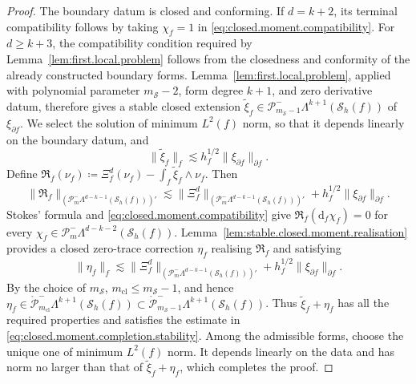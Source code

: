 \documentclass[a4paper,11pt]{article}
\theoremstyle{definition}
\newcommand{\DIFF}{\mathrm{d}}
\newcommand{\Sh}{\mathcal{S}_h}
\newcommand{\PLtrim}[2]{\mathcal{P}_{#1}^{-}\Lambda^{#2}}
\newcommand{\PLtrimz}[2]{\mathring{\mathcal P}_{#1}^{-}\Lambda^{#2}}
\begin{document}
\begin{proof}
The boundary datum is closed and conforming.
If $d=k+2$, its terminal compatibility follows by taking $\chi_f=1$ in \eqref{eq:closed.moment.compatibility}.
For $d\geq k+3$, the compatibility condition required by Lemma~\ref{lem:first.local.problem} follows from the closedness and conformity of the already constructed boundary forms.
Lemma~\ref{lem:first.local.problem}, applied with polynomial parameter $m_{\mathcal S}-2$, form degree $k+1$, and zero derivative datum, therefore gives a stable closed extension $\widetilde\xi_f \in \PLtrim{m_{\mathcal S}-1}{k+1}(\Sh(f))$ of $\xi_{\partial f}$.
We select the solution of minimum $L^2(f)$ norm, so that it depends linearly on the boundary datum, and
\[
  \|\widetilde\xi_f\|_f
  \lesssim
  h_f^{1/2}\|\xi_{\partial f}\|_{\partial f}.
\]
Define $\mathfrak R_f(\nu_f) \coloneqq \Xi_f^d(\nu_f) - \int_f\widetilde\xi_f\wedge\nu_f$.
Then
\[
  \|\mathfrak R_f\|_{\left(\PLtrim{m}{d-k-1}(\Sh(f))\right)'}
  \lesssim
  \|\Xi_f^d\|_{\left(\PLtrim{m}{d-k-1}(\Sh(f))\right)'}
  +
  h_f^{1/2}\|\xi_{\partial f}\|_{\partial f}.
\]
Stokes' formula and \eqref{eq:closed.moment.compatibility} give $\mathfrak R_f(\DIFF_f\chi_f)=0$ for every $\chi_f\in\PLtrim{m}{d-k-2}(\Sh(f))$.
Lemma~\ref{lem:stable.closed.moment.realisation} provides a closed zero-trace correction $\eta_f$ realising $\mathfrak R_f$ and satisfying
\[
  \|\eta_f\|_f
  \lesssim
  \|\Xi_f^d\|_{\left(\PLtrim{m}{d-k-1}(\Sh(f))\right)'}
  +
  h_f^{1/2}\|\xi_{\partial f}\|_{\partial f}.
\]
By the choice of $m_{\mathcal S}$, $m_{\mathrm{cl}}\leq m_{\mathcal S}-1$, and hence $\eta_f \in \PLtrimz{m_{\mathrm{cl}}}{k+1}(\Sh(f)) \subset \PLtrimz{m_{\mathcal S}-1}{k+1}(\Sh(f))$.
Thus $\widetilde\xi_f+\eta_f$ has all the required properties and satisfies the estimate in \eqref{eq:closed.moment.completion.stability}.
Among the admissible forms, choose the unique one of minimum $L^2(f)$ norm.
It depends linearly on the data and has norm no larger than that of $\widetilde\xi_f+\eta_f$, which completes the proof.
\end{proof}
\end{document}
